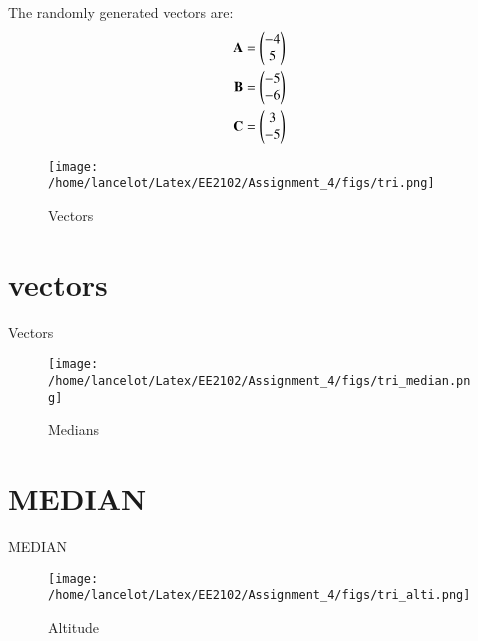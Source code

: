 \documentclass[journal,12pt,onecolumn]{IEEEtran}
\theoremstyle{remark}
\begin{document}
%
The randomly generated vectors are:
\begin{align}
\mathbf{A}&=\begin{pmatrix}-4\\5\end{pmatrix}\\
\mathbf{B}&=\begin{pmatrix}-5\\-6\end{pmatrix}\\
\mathbf{C}&=\begin{pmatrix}3\\-5\end{pmatrix}
\end{align}
\begin{figure}[!ht]
  \centering
  \texttt{[image: /home/lancelot/Latex/EE2102/Assignment\_4/figs/tri.png]}
  \caption{Vectors}
\end{figure}
\begin{table}[!ht]
 \section{vectors}
 \centering
 
 \caption{Vectors}
 \label{table:vectors}
\end{table}
\begin{figure}[!ht]
  \centering
  \texttt{[image: /home/lancelot/Latex/EE2102/Assignment\_4/figs/tri\_median.png]}
  \caption{Medians}
\end{figure}
\begin{table}[!ht]
 \section{MEDIAN}
 \centering
 
 \caption{MEDIAN}
 \label{table:MEDIAN}
\end{table}
\begin{figure}[!ht]
  \centering
  \texttt{[image: /home/lancelot/Latex/EE2102/Assignment\_4/figs/tri\_alti.png]}
  \caption{Altitude}
\end{figure}
\end{document}
